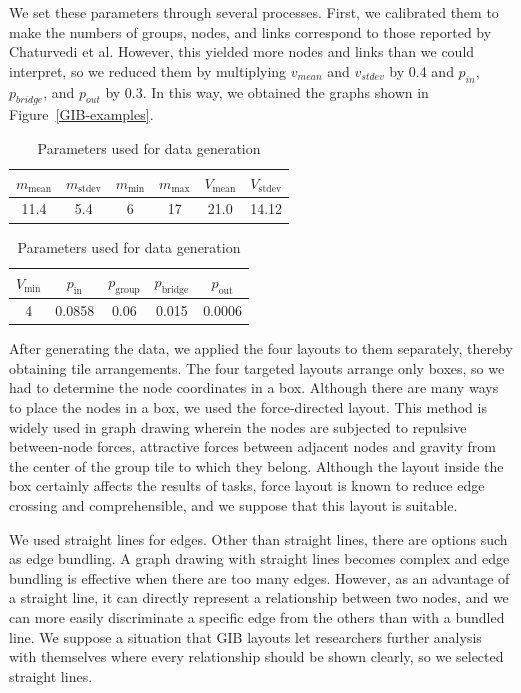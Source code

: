 \documentclass[review]{vgtc}                 %
\begin{document}
We set these parameters through several processes.
First, we calibrated them to make the numbers of groups, nodes, and links correspond to those reported by Chaturvedi et al.
However, this yielded more nodes and links than we could interpret, so we reduced them by multiplying $v_{mean}$ and $v_{stdev}$ by 0.4 and $p_{in}$, $p_{bridge}$, and $p_{out}$ by 0.3.
In this way, we obtained the graphs shown in Figure~\ref{GIB-examples}.

\begin{table}[b]
  \begin{center}
  \caption{Parameters used for data generation}
  \label{parameters}
    \begin{tabular}{|c|c|c|c|c|c|} \hline
      $m_{\text{mean}}$ & $m_{\text{stdev}}$ & $m_{\text{min}}$ & $m_{\text{max} }$ & $V_{\text{mean}}$ & $V_{\text{stdev}}$ \\ \hline 
      11.4 & 5.4 & 6 & 17 & 21.0 & 14.12 \\ \hline
    \end{tabular}
    \begin{tabular}{|c|c|c|c|c|} \hline
      $V_{\text{min}}$ & $p_{\text{in}}$ & $p_{\text{group}}$ & $p_{\text{bridge}}$ & $p_{\text{out}}$ \\ \hline
      4 & 0.0858 & 0.06 & 0.015 & 0.0006 \\ \hline
    \end{tabular}
  \end{center}
\end{table}

After generating the data, we applied the four layouts to them separately, thereby obtaining tile arrangements.
The four targeted layouts arrange only boxes, so we had to determine the node coordinates in a box.
Although there are many ways to place the nodes in a box, we used the force-directed layout.
This method is widely used in graph drawing wherein the nodes are subjected to repulsive between-node forces, attractive forces between adjacent nodes and gravity from the center of the group tile to which they belong.
Although the layout inside the box certainly affects the results of tasks, force layout is known to reduce edge crossing and comprehensible, and we suppose that this layout is suitable.

We used straight lines for edges.
Other than straight lines, there are options such as edge bundling.
A graph drawing with straight lines becomes complex and edge bundling is effective when there are too many edges.
However, as an advantage of a straight line, it can directly represent a relationship between two nodes, and we can more easily discriminate a specific edge from the others than with a bundled line.
We suppose a situation that GIB layouts let researchers further analysis with themselves where every relationship should be shown clearly, so we selected straight lines.
\end{document}
